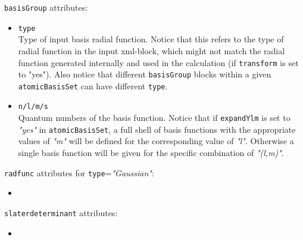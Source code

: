 \texttt{basisGroup} attributes:

\begin{itemize}
\item \texttt{type}\\
  Type of input basis radial function. Notice that this refers to the type of radial function in the input xml-block, which might not match the radial function generated internally and used in the calculation (if \texttt{transform} is set to "yes"). Also notice that different \texttt{basisGroup} blocks within a given \texttt{atomicBasisSet} can have different \texttt{type}.
\item \texttt{n/l/m/s}\\
  Quantum numbers of the basis function. Notice that if \texttt{expandYlm} is set to \textit{"yes"} in \texttt{atomicBasisSet}, a full shell of basis functions with the appropriate values of \textit{"m"} will be defined for the corresponding value of \textit{"l"}. Otherwise a single basis function will be given for the specific combination of \textit{"(l,m)"}. 
\end{itemize}

\texttt{radfunc} attributes for \texttt{type}=\textit{"Gaussian"}:

\begin{itemize}
\item \texttt{}\\
\end{itemize}

\texttt{slaterdeterminant} attributes:

\begin{itemize}
\item \texttt{}\\
\end{itemize}



